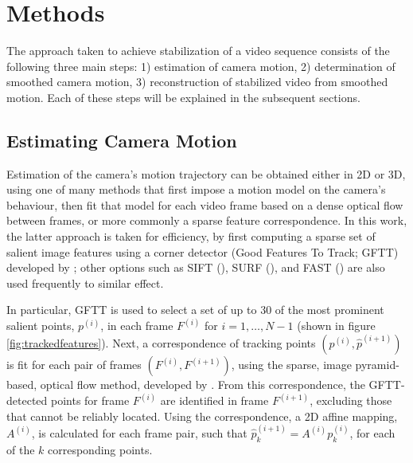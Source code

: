 \documentclass{article} %
\begin{document}
\section{Methods}
The approach taken to achieve stabilization of a video sequence consists of the following three main steps: 1) estimation of camera motion, 2) determination of smoothed camera motion, 3) reconstruction of stabilized video from smoothed motion. Each of these steps will be explained in the subsequent sections.

\subsection{Estimating Camera Motion}
Estimation of the camera's motion trajectory can be obtained either in 2D or 3D, using one of many methods that first impose a motion model on the camera's behaviour, then fit that model for each video frame based on a dense optical flow between frames, or more commonly a sparse feature correspondence. In this work, the latter approach is taken for efficiency, by first computing a sparse set of salient image features using a corner detector (Good Features To Track; GFTT) developed by \cite{JianboShi1994}; other options such as SIFT (\cite{Lowe2004}), SURF (\cite{Bay2006}), and FAST (\cite{Rosten2006}) are also used frequently to similar effect.

In particular, GFTT is used to select a set of up to 30 of the most prominent salient points, $p^{(i)}$, in each frame $F^{(i)}$ for $i=1,\dotsc,N-1$ (shown in figure \ref{fig:trackedfeatures}). Next, a correspondence of tracking points $(p^{(i)}, \hat{p}^{(i+1)})$ is fit for each pair of frames $(F^{(i)}, F^{(i+1)})$, using the sparse, image pyramid-based, optical flow method, developed by \cite{Lucas1981}. From this correspondence, the GFTT-detected points for frame $F^{(i)}$ are identified in frame $F^{(i+1)}$, excluding those that cannot be reliably located. Using the correspondence, a 2D affine mapping, $A^{(i)}$, is calculated for each frame pair, such that $\hat{p}^{(i+1)}_k = A^{(i)} p^{(i)}_k$, for each of the $k$ corresponding points.
\end{document}
